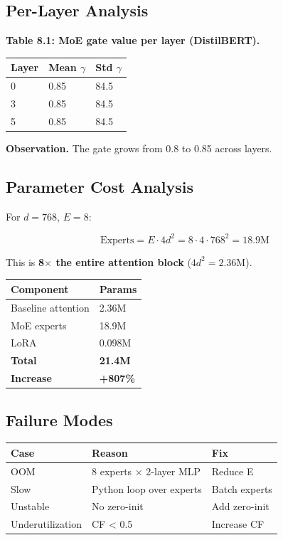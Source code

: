 \subsection{Per-Layer Analysis}

\textbf{Table 8.1: MoE gate value per layer (DistilBERT).}

\begin{table}[H]
\centering
\small
\begin{tabular}{lll}
\toprule
\textbf{Layer} & \textbf{Mean $\gamma$} & \textbf{Std $\gamma$} \\
\midrule
0 & 0.85 & 84.5 \\
3 & 0.85 & 84.5 \\
5 & 0.85 & 84.5 \\
\bottomrule
\end{tabular}
\end{table}

\textbf{Observation.} The gate grows from 0.8 to 
0.85 across layers.

\subsection{Parameter Cost Analysis}

For $d = 768$, $E = 8$:

\[
\text{Experts} = E \cdot 4 d^2 = 8 \cdot 4 \cdot 768^2 = 18.9\text{M}
\tag{8.2}
\]

This is \textbf{8$\times$ the entire attention block} ($4 d^2 = 2.36$M).

\begin{table}[H]
\centering
\small
\begin{tabular}{ll}
\toprule
\textbf{Component} & \textbf{Params} \\
\midrule
Baseline attention & 2.36M \\
MoE experts & 18.9M \\
LoRA & 0.098M \\
\textbf{Total} & \textbf{21.4M} \\
\textbf{Increase} & \textbf{+807\%} \\
\bottomrule
\end{tabular}
\end{table}

\subsection{Failure Modes}

\begin{table}[H]
\centering
\small
\begin{tabular}{lll}
\toprule
\textbf{Case} & \textbf{Reason} & \textbf{Fix} \\
\midrule
OOM & 8 experts $\times$ 2-layer MLP & Reduce E \\
Slow & Python loop over experts & Batch experts \\
Unstable & No zero-init & Add zero-init \\
Underutilization & CF < 0.5 & Increase CF \\
\bottomrule
\end{tabular}
\end{table}

